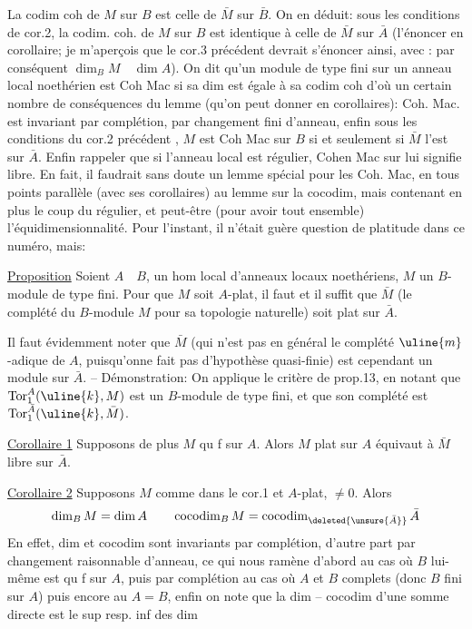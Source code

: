 La codim coh de $M$ sur $B$ est celle de $\bar M$ sur $\bar B$. On en déduit: sous les conditions de cor.2, la codim. coh. de $M$ sur $B$ est identique à celle de $\bar M$ sur $\bar A$ (l'énoncer en corollaire; je m'aperçois que le cor.3 précédent devrait s'énoncer ainsi, avec : par conséquent $\dim_B M\quad\dim A$). On dit qu'un module de type fini sur un anneau local noethérien est Coh Mac si sa dim est égale à sa codim coh d'où un certain nombre de conséquences du lemme (qu'on peut donner en corollaires): Coh. Mac. est invariant par complétion, par changement fini d'anneau, enfin sous les conditions du cor.2 précédent , $M$ est Coh Mac sur $B$ si et seulement si $\bar M$ l'est sur $\bar A$. Enfin rappeler que si l'anneau local est régulier, Cohen Mac sur lui signifie libre. En fait, il faudrait sans doute un lemme spécial pour les Coh. Mac, en tous points parallèle (avec ses corollaires) au lemme sur la cocodim, mais contenant en plus le coup du régulier, et peut-être (pour avoir tout ensemble) l'équidimensionnalité. Pour l'instant, il n'était guère question de platitude dans ce numéro, mais:

\uline{Proposition} Soient $A\quad B$,  un hom local d'anneaux locaux noethériens, $M$ un $B$-module de type fini. Pour que $M$ soit $A$-plat, il faut et il suffit que $\bar M$ (le complété du $B$-module $M$ pour sa topologie naturelle) soit plat sur $\bar A$.

Il faut évidemment noter que $\bar M$ (qui n'est pas en général le complété $\uline{m}$-adique de $A$, puisqu'onne fait pas d'hypothèse quasi-finie) est cependant un module sur $\bar A$. -- Démonstration: On applique le critère de prop.13, en notant que $\operatorname{Tor}_1^A(\uline{k},M)$ est un $B$-module de type fini, et que son complété est $\operatorname{Tor}_1^{\bar A}(\uline{k},\bar M)$.

\uline{Corollaire 1} Supposons de plus $M$ qu f sur $A$. Alors $M$ plat sur $A$ équivaut à $\bar M$ libre sur $\bar A$.

\uline{Corollaire 2} Supposons $M$ comme dans le cor.1 et $A$-plat, $\ne0$. Alors
\[
\dim_B M=\dim A\qquad \operatorname{cocodim}_B M=\operatorname{cocodim}_{\deleted{\unsure{\bar A}}}\bar A
\]
En effet, dim et cocodim sont invariants par complétion, d'autre part par changement raisonnable d'anneau, ce qui nous ramène d'abord au cas où $B$ lui-même est qu f sur $A$, puis par complétion au cas où $A$ et $B$ complets (donc $B$ fini sur $A$) puis encore au $A=B$, enfin on note que la dim -- cocodim d'une somme directe est le sup resp. inf des dim 

